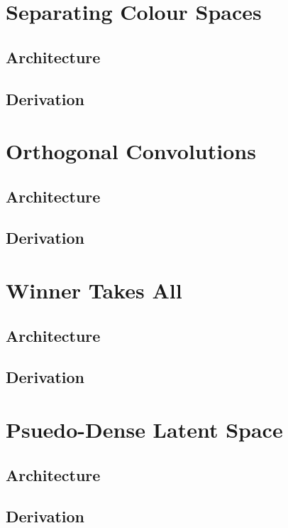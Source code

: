 \section{Separating Colour Spaces}
\lipsum[2]
\subsection{Architecture}
\subsection{Derivation}

\section{Orthogonal Convolutions}
\lipsum[2]
\subsection{Architecture}
\subsection{Derivation}

\section{Winner Takes All}
\lipsum[2]
\subsection{Architecture}
\subsection{Derivation}

\section{Psuedo-Dense Latent Space}
\lipsum[2]
\subsection{Architecture}
\subsection{Derivation}
